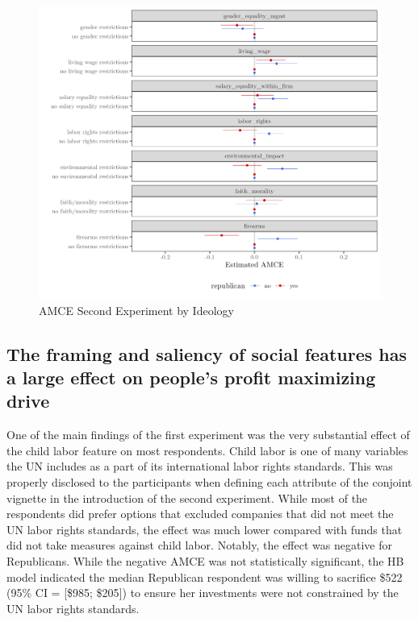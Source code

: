 \documentclass[
  12pt,
]{article}
\begin{document}
\begin{figure}

{\centering \includegraphics{amce2_byr_shorter} 

}

\caption{AMCE Second Experiment by Ideology}\label{fig:amce2byr}
\end{figure}

\hypertarget{the-framing-and-saliency-of-social-features-has-a-large-effect-on-peoples-profit-maximizing-drive}{%
\subsection{The framing and saliency of social features has a large effect on people's profit maximizing drive}\label{the-framing-and-saliency-of-social-features-has-a-large-effect-on-peoples-profit-maximizing-drive}}

One of the main findings of the first experiment was the very substantial effect of the child labor feature on most respondents. Child labor is one of many variables the UN includes as a part of its international labor rights standards. This was properly disclosed to the participants when defining each attribute of the conjoint vignette in the introduction of the second experiment. While most of the respondents did prefer options that excluded companies that did not meet the UN labor rights standards, the effect was much lower compared with funds that did not take measures against child labor. Notably, the effect was negative for Republicans. While the negative AMCE was not statistically significant, the HB model indicated the median Republican respondent was willing to sacrifice \$522 (95\% CI = {[}\$985; \$205{]}) to ensure her investments were not constrained by the UN labor rights standards.
\end{document}
